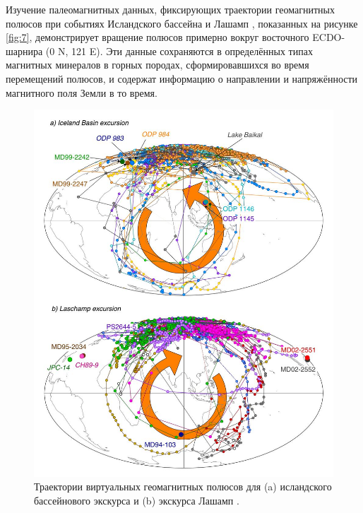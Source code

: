 \documentclass[10pt,twocolumn,letterpaper]{article}
\begin{document}
Изучение палеомагнитных данных, фиксирующих траектории геомагнитных полюсов при событиях Исландского бассейна и Лашамп \cite{35}, показанных на рисунке \ref{fig:7}, демонстрирует вращение полюсов примерно вокруг восточного ECDO-шарнира (0 N, 121 E). Эти данные сохраняются в определённых типах магнитных минералов в горных породах, сформировавшихся во время перемещений полюсов, и содержат информацию о направлении и напряжённости магнитного поля Земли в то время.
\begin{figure}[t]
\begin{center}
   \includegraphics[width=0.95\linewidth]{laj.jpg}
\end{center}
   \caption{Траектории виртуальных геомагнитных полюсов для (a) исландского бассейнового экскурса и (b) экскурса Лашамп \cite{35}.}
\label{fig:7}
\label{fig:onecol}
\end{figure}
\end{document}
